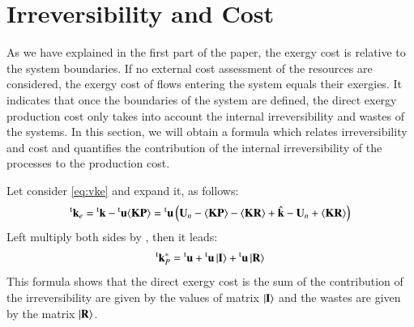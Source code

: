 \documentclass{ecos2018}
\begin{document}
\section{Irreversibility and Cost}
As we have explained in the first part of the paper, the exergy cost is relative to the system boundaries. If no external cost assessment of the resources are considered, the exergy cost of flows entering the system equals their exergies. It indicates that once the boundaries of the system are defined, the direct exergy production cost only takes into account the internal irreversibility and wastes of the systems. In this section, we will obtain a formula which relates irreversibility and cost and quantifies the contribution of the internal irreversibility of the processes to the production cost.

Let consider \cref{eq:vke} and expand it, as follows:
\begin{equation}
\prescript{\smash{\mathrm{t}}}{}{\mathbf{k}}_e=\prescript{\smash{\mathrm{t}}}{}{\mathbf{k}}-\prescript{\smash{\mathrm{t}}}{}{\mathbf{u}}\langle \textbf{KP} \rangle=\prescript{\smash{\mathrm{t}}}{}{\mathbf{u}}\left(\mathbf{U}_n-\langle \textbf{KP} \rangle-\langle \textbf{KR} \rangle+ \hat{\mathbf{k}}- \mathbf{U}_n + \langle \textbf{KR} \rangle\right)
\end{equation}
Left multiply both sides by , then it leads:
\begin{equation}
\label{eq:dicf}
\prescript{\smash{\mathrm{t}}}{}{\mathbf{k}}_P^*=\prescript{\smash{\mathrm{t}}}{}{\mathbf{u}} + \prescript{\smash{\mathrm{t}}}{}{\mathbf{u}}\left| {\textbf{I} } \right\rangle+\prescript{\smash{\mathrm{t}}}{}{\mathbf{u}}\left| {\textbf{R} } \right\rangle
\end{equation}
This formula shows that the direct exergy cost is the sum of the contribution of the irreversibility are given by the values of matrix $\left| {\textbf{I} } \right\rangle$ and the wastes are given by the matrix $\left| {\textbf{R} } \right\rangle$. 
\end{document}
